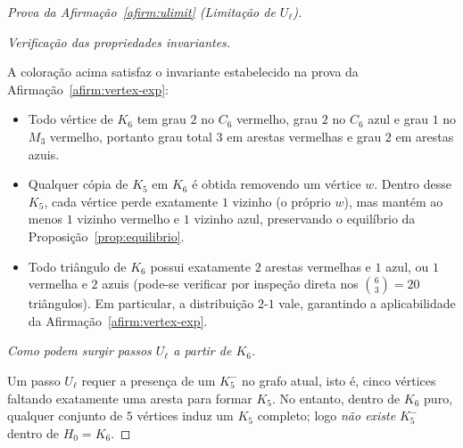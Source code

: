 \documentclass[reqno, 12pt]{amsart}
\numberwithin{equation}{section}
\theoremstyle{plain}
\theoremstyle{definition}
\begin{document}
\begin{proof}[Prova da Afirmação~\ref{afirm:ulimit} (Limitação de $U_\ell$)]
\begin{center}
    \end{center}

    \medskip
    \noindent\textit{Verificação das propriedades invariantes.}

    A coloração acima satisfaz o invariante estabelecido na prova da
    Afirmação~\ref{afirm:vertex-exp}:

    \begin{itemize}
        \item Todo vértice de $K_6$ tem grau $2$ no $C_6$ vermelho, grau $2$ no $C_6$ azul
              e grau $1$ no $M_3$ vermelho, portanto grau total $3$ em arestas vermelhas e
              grau $2$ em arestas azuis.

        \item Qualquer cópia de $K_5$ em $K_6$ é obtida removendo um vértice $w$.
              Dentro desse $K_5$, cada vértice perde exatamente $1$ vizinho (o próprio $w$),
              mas mantém ao menos $1$ vizinho vermelho e $1$ vizinho azul, preservando o
              equilíbrio da Proposição~\ref{prop:equilibrio}.

        \item Todo triângulo de $K_6$ possui exatamente $2$ arestas vermelhas e $1$ azul,
              ou $1$ vermelha e $2$ azuis (pode-se verificar por inspeção direta nos
              $\binom{6}{3} = 20$ triângulos). Em particular, a distribuição $2$-$1$ vale,
              garantindo a aplicabilidade da Afirmação~\ref{afirm:vertex-exp}.
    \end{itemize}

    \medskip
    \noindent\textit{Como podem surgir passos $U_\ell$ a partir de $K_6$.}

    Um passo $U_\ell$ requer a presença de um $K_5^-$ no grafo atual, isto é, cinco
    vértices faltando exatamente uma aresta para formar $K_5$.
    No entanto, dentro de $K_6$ puro, qualquer conjunto de $5$ vértices induz um $K_5$
    completo; logo \emph{não existe} $K_5^-$ dentro de $H_0 = K_6$.


\end{proof}
\end{document}
